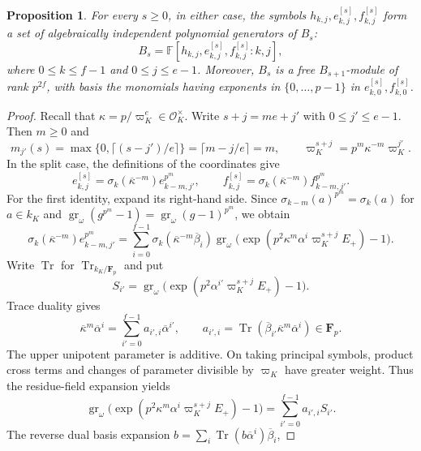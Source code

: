 \documentclass[11pt]{article}
\numberwithin{equation}{section}
\newtheorem{proposition}[theorem]{Proposition}
\theoremstyle{definition}
\theoremstyle{remark}
\newcommand{\F}{\mathbb F}
\newcommand{\cO}{\mathcal O}
\DeclareMathOperator{\gr}{gr}
\begin{document}
\begin{proposition}\label{prop:casimir-level-generators}
For every $s\geq0$, in either case, the symbols
$h_{k,j},e_{k,j}^{[s]},f_{k,j}^{[s]}$ form a set of
algebraically independent polynomial generators of $B_s$:
\begin{equation}\label{eq:casimir-level-generators}
 B_s=\F[h_{k,j},e_{k,j}^{[s]},f_{k,j}^{[s]}:k,j],
\end{equation}
where $0\leq k\leq f-1$ and $0\leq j\leq e-1$.
Moreover, $B_s$ is a free $B_{s+1}$-module of rank $p^{2f}$,
with basis the monomials having exponents in $\{0,\ldots,p-1\}$
in $e_{k,0}^{[s]},f_{k,0}^{[s]}$.
\end{proposition}

\begin{proof}
Recall that $\kappa=p/\varpi_K^e\in\cO_K^\times$.
Write $s+j=me+j'$ with $0\leq j'\leq e-1$. Then $m\geq0$ and
\[
 m_{j'}(s)=\max\{0,\lceil(s-j')/e\rceil\}
       =\lceil m-j/e\rceil=m,\qquad
 \varpi_K^{s+j}=p^m\kappa^{-m}\varpi_K^{j'}.
\]
In the split case, the definitions of the coordinates give
\begin{equation}\label{eq:casimir-coordinate-carry}
 e_{k,j}^{[s]}=\sigma_k(\overline\kappa^{-m})
                  e_{k-m,j'}^{p^m},\qquad
 f_{k,j}^{[s]}=\sigma_k(\overline\kappa^{-m})
                  f_{k-m,j'}^{p^m}.
\end{equation}
For the first identity, expand its right-hand side. Since
$\sigma_{k-m}(a)^{p^m}=\sigma_k(a)$ for $a\in k_K$ and
$\gr_\omega(g^{p^m}-1)=\gr_\omega(g-1)^{p^m}$, we obtain
\[
 \sigma_k(\overline\kappa^{-m})e_{k-m,j'}^{p^m}
 =\sum_{i=0}^{f-1}\sigma_k(\overline\kappa^{-m}\overline\beta_i)
   \gr_\omega\bigl(
       \exp(p^2\kappa^m\alpha^i\varpi_K^{s+j}E_+)-1\bigr).
\]
Write $\operatorname{Tr}$ for $\operatorname{Tr}_{k_K/\mathbf F_p}$ and put
\[
 S_{i'}=\gr_\omega\bigl(
       \exp(p^2\alpha^{i'}\varpi_K^{s+j}E_+)-1\bigr).
\]
Trace duality gives
\[
 \overline\kappa^m\overline\alpha^i
   =\sum_{i'=0}^{f-1}a_{i',i}\overline\alpha^{i'},
 \qquad
 a_{i',i}=\operatorname{Tr}
   (\overline\beta_{i'}\overline\kappa^m\overline\alpha^i)
   \in\mathbf F_p.
\]
The upper unipotent parameter is additive. On taking principal
symbols, product cross terms and changes of parameter divisible by
$\varpi_K$ have greater weight. Thus the residue-field expansion yields
\[
 \gr_\omega\bigl(
       \exp(p^2\kappa^m\alpha^i\varpi_K^{s+j}E_+)-1\bigr)
   =\sum_{i'=0}^{f-1}a_{i',i}S_{i'}.
\]
The reverse dual basis expansion
$b=\sum_i\operatorname{Tr}(b\overline\alpha^i)\overline\beta_i$,

\end{proof}
\end{document}
